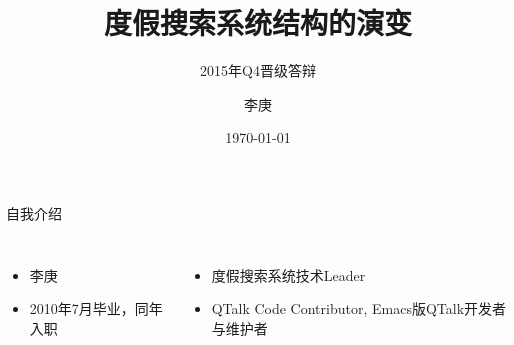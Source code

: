 \documentclass{beamer}
\begin{document}
\begin{CJK}{UTF8}{gbsn}

\title{度假搜索系统结构的演变}

\subtitle{2015年Q4晋级答辩}

\author{李庚}


\date{\today}


\begin{frame}
  \titlepage
\end{frame}

\begin{frame}{自我介绍}
  \begin{columns}
    \begin{itemize}
      \item { 李庚 }
      \item { 2010年7月毕业，同年入职 }
    \end{itemize}
    \begin{itemize}[1]
      \item<2-> 度假搜索系统技术Leader
      \item<3-> QTalk Code Contributor, Emacs版QTalk开发者与维护者
    \end{itemize}
  \end{columns}  
\end{frame}


\end{CJK}
\end{document}
